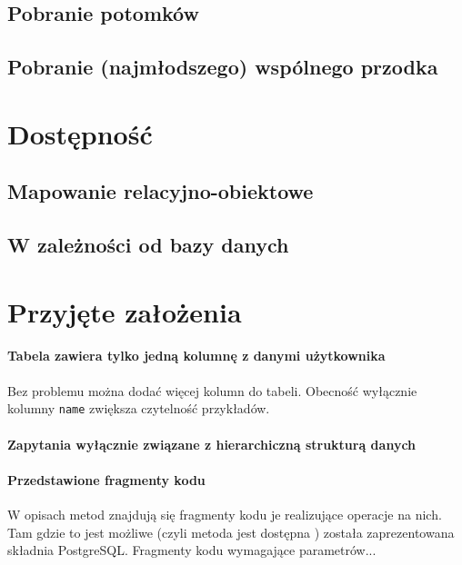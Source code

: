 \subsection{Pobranie potomków}
\subsection{Pobranie (najmłodszego) wspólnego przodka}




\section{Dostępność}
\subsection{Mapowanie relacyjno-obiektowe}
\subsection{W zależności od bazy danych}


\section{Przyjęte założenia}

\paragraph{Tabela zawiera tylko jedną kolumnę z danymi użytkownika} 
Bez problemu można dodać więcej kolumn do tabeli. Obecność wyłącznie kolumny \texttt{name} zwiększa czytelność przykładów.
\paragraph{Zapytania wyłącznie związane z hierarchiczną strukturą danych} 

\paragraph{Przedstawione fragmenty kodu} 
W opisach metod znajdują się fragmenty kodu je realizujące operacje na nich. 
Tam gdzie to jest możliwe (czyli metoda jest dostępna ) została zaprezentowana składnia PostgreSQL.
Fragmenty kodu  wymagające parametrów...

